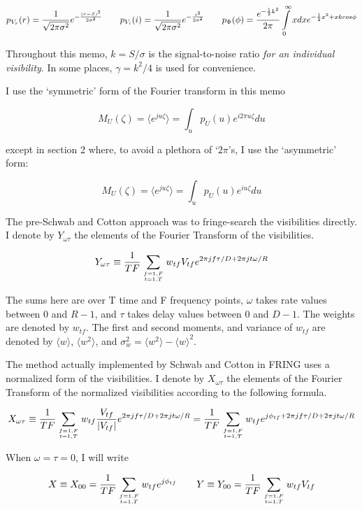 $$p_{V_r}(r) = {1\over\sqrt{2\pi\sigma^2}}e^{-{(r-S)^2\over2\sigma^2}} \qquad
  p_{V_i}(i) = {1\over\sqrt{2\pi\sigma^2}}e^{-{i^2\over2\sigma^2}} \qquad
  p_\Phi(\phi) = {e^{-{1\over2}k^2}\over2\pi}\int\limits_0^\infty xdx
                   e^{-{1\over2}x^2 + xkcos\phi}$$

Throughout this memo, $k=S/\sigma$ is the signal-to-noise ratio {\em
for an individual visibility}.  In some places, $\gamma = k^2/4$ is
used for convenience.

I use the `symmetric' form of the Fourier transform in this memo

$$M_U(\zeta) = \langle e^{ju\zeta}\rangle =
\int_up_U(u)e^{i2\pi u\zeta}du$$

except in section 2 where, to avoid a plethora of  `$2\pi$'s, I use the
`asymmetric' form:

$$M_U(\zeta) = \langle e^{ju\zeta}\rangle =
\int_up_U(u)e^{iu\zeta}du$$

The pre-Schwab and Cotton approach was to fringe-search the
visibilities directly.  I denote by $Y_{\omega\tau}$ the elements of
the Fourier Transform of the visibilities.

$$Y_{\omega\tau} \equiv{1\over TF}\sum\limits_{f=1,F\atop t=1,T}
w_{tf}V_{tf}e^{2\pi jf\tau/D + 2\pi jt\omega/R}$$

The sums here are over T time and F frequency points, $\omega$ takes
rate values between $0$ and $R-1$, and $\tau$ takes delay values
between $0$ and $D-1$.  The weights are denoted by $w_{tf}$.  The
first and second moments, and variance of $w_{tf}$ are denoted by
$\langle w\rangle$, $\langle w^2\rangle$, and $\sigma_w^2 = \langle
w^2\rangle-\langle w\rangle^2$.

The method actually implemented by Schwab and Cotton in FRING uses a
normalized form of the visibilities.  I denote by $X_{\omega\tau}$ the
elements of the Fourier Transform of the normalized visibilities
according to the following formula.

$$X_{\omega\tau} \equiv{1\over TF}\sum\limits_{f=1,F\atop t=1,T}
w_{tf}{V_{tf}\over|V_{tf}|}e^{2\pi jf\tau/D + 2\pi jt\omega/R}
                = {1\over TF}\sum\limits_{f=1,F\atop t=1,T}
w_{tf}e^{j\phi_{tf} + 2\pi jf\tau/D + 2\pi jt\omega/R}$$

When $\omega = \tau = 0$, I will write

$$X \equiv X_{00} = {1\over TF}\sum\limits_{f=1,F\atop t=1,T}w_{tf}e^{j\phi_{tf}}
\qquad
Y \equiv Y_{00} = {1\over TF}\sum\limits_{f=1,F\atop t=1,T} w_{tf}V_{tf}$$

